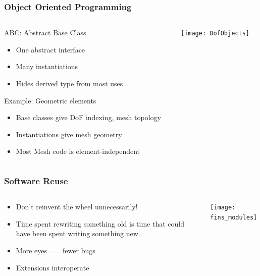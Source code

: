 \documentclass[mathserif]{beamer}
\begin{document}
\begin{frame}
\frametitle{Object Oriented Programming}
\begin{columns}
\begin{column}{.55\textwidth}
\begin{block}{ABC: Abstract Base Class}
\begin{itemize}
\item One abstract interface
\item Many instantiations
\item Hides derived type from most uses
\end{itemize}
\end{block}

Example: Geometric elements
\begin{itemize}
\item Base classes give DoF indexing, mesh topology
\item Instantiations give mesh geometry
\item Most Mesh code is element-independent
\end{itemize}
\end{column}
\begin{column}{.45\textwidth}
\begin{center}
\texttt{[image: DofObjects]}
\end{center}
\end{column}
\end{columns}

\end{frame}


\begin{frame}
\frametitle{Software Reuse}
\begin{columns}
\begin{column}{.4\textwidth}

\begin{itemize}
\item Don't reinvent the wheel unnecessarily!

\item Time spent rewriting something old is time that could have been spent
writing something new.

\item More eyes == fewer bugs

\item Extensions interoperate
\end{itemize}
\end{column}
\begin{column}{.6\textwidth}
\begin{center}
\texttt{[image: fins\_modules]}
\end{center}
\end{column}
\end{columns}

\end{frame}
\end{document}
